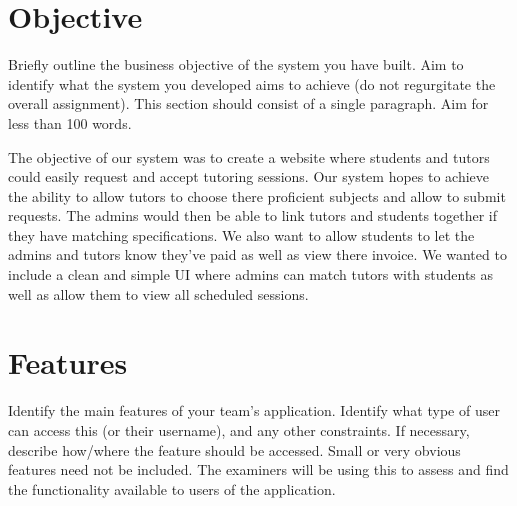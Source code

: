 \documentclass[11pt,a4paper]{article}
\begin{document}
\section*{Objective}
Briefly outline the business objective of the system you have built.  Aim to identify what the system you developed aims to achieve (do not regurgitate the overall assignment).  This section should consist of a single paragraph.  Aim for less than 100 words.

The objective of our system was to create a website where students and tutors could easily request and accept tutoring sessions. Our system hopes to achieve the ability to allow tutors to choose there proficient subjects and allow to submit requests. The admins would then be able to link tutors and students together if they have matching specifications. We also want to allow students to let the admins and tutors know they've paid as well as view there invoice. We wanted to include a clean and simple UI where admins can match tutors with students as well as allow them to view all scheduled sessions.

\section*{Features}
Identify the main features of your team's application.  Identify what type of user can access this (or their username), and any other constraints.  If necessary, describe how/where the feature should be accessed.  Small or very obvious features need not be included.  The examiners will be using this to assess and find the functionality available to users of the application.  
\end{document}
